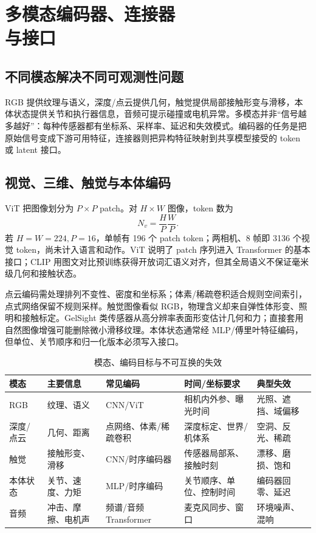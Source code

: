\chapter[多模态编码器、连接器与接口]{多模态编码器、连接器\\与接口}
\label{chap:multimodal-connectors}

\section{不同模态解决不同可观测性问题}

RGB 提供纹理与语义，深度/点云提供几何，触觉提供局部接触形变与滑移，本体状态提供关节和执行器信息，音频可提示碰撞或电机异常。多模态并非“信号越多越好”：每种传感器都有坐标系、采样率、延迟和失效模式。编码器的任务是把原始信号变成下游可用特征，连接器则把异构特征映射到共享模型接受的 token 或 latent 接口。

\section{视觉、三维、触觉与本体编码}

ViT 把图像划分为 $P\times P$ patch。对 $H\times W$ 图像，token 数为
\begin{equation}
N_v=\frac{H}{P}\frac{W}{P}.
\end{equation}
若 $H=W=224,P=16$，单帧有 196 个 patch token；两相机、8 帧即 3136 个视觉 token，尚未计入语言和动作。ViT 说明了 patch 序列进入 Transformer 的基本接口\cite{dosovitskiy2021vit}；CLIP 用图文对比预训练获得开放词汇语义对齐\cite{radford2021clip}，但其全局语义不保证毫米级几何和接触状态。

点云编码需处理排列不变性、密度和坐标系；体素/稀疏卷积适合规则空间索引，点式网络保留不规则采样。触觉图像看似 RGB，物理含义却来自弹性体形变、照明和接触标定。GelSight 类传感器从高分辨率表面形变估计几何和力\cite{yuan2017gelsight}；直接套用自然图像增强可能删除微小滑移纹理。本体状态通常经 MLP/傅里叶特征编码，但单位、关节顺序和归一化版本必须写入接口。

\begin{table}[H]
\centering
\caption{模态、编码目标与不可互换的失效}
\label{tab:modality-encoder-failures}
\begin{tabularx}{\textwidth}{p{}YYYY}
\toprule
模态 & 主要信息 & 常见编码 & 时间/坐标要求 & 典型失效 \\
\midrule
RGB & 纹理、语义 & CNN/ViT & 相机内外参、曝光时间 & 光照、遮挡、域偏移 \\
深度/点云 & 几何、距离 & 点网络、体素/稀疏卷积 & 深度标定、世界/机体系 & 空洞、反光、稀疏 \\
触觉 & 接触形变、滑移 & CNN/时序编码器 & 传感器局部系、接触时刻 & 漂移、磨损、饱和 \\
本体状态 & 关节、速度、力矩 & MLP/时序编码 & 关节顺序、单位、控制时间 & 编码器回零、延迟 \\
音频 & 冲击、摩擦、电机声 & 频谱/音频 Transformer & 麦克风同步、窗口 & 环境噪声、混响 \\
\bottomrule
\end{tabularx}
\end{table}

